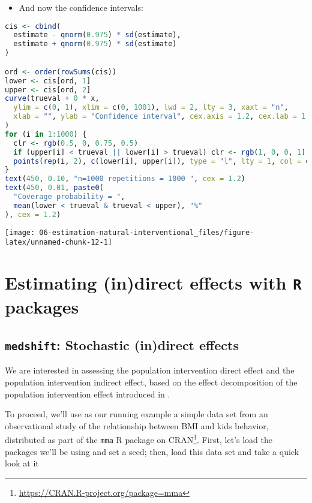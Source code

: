 \documentclass[
  12pt,
]{book}
\newcommand{\passthrough}[1]{#1}
\providecommand{\tightlist}{%
  \setlength{\itemsep}{0pt}\setlength{\parskip}{0pt}}
\renewcommand{\href}[2]{#2\footnote{\url{#1}}}
\theoremstyle{definition}
\theoremstyle{definition}
\theoremstyle{definition}
\newcommand{\1}{\mathbbm{1}}
\begin{document}
\begin{itemize}
\tightlist
\item
  And now the confidence intervals:
\end{itemize}

\begin{lstlisting}[language=R]
cis <- cbind(
  estimate - qnorm(0.975) * sd(estimate),
  estimate + qnorm(0.975) * sd(estimate)
)

ord <- order(rowSums(cis))
lower <- cis[ord, 1]
upper <- cis[ord, 2]
curve(trueval + 0 * x,
  ylim = c(0, 1), xlim = c(0, 1001), lwd = 2, lty = 3, xaxt = "n",
  xlab = "", ylab = "Confidence interval", cex.axis = 1.2, cex.lab = 1.2
)
for (i in 1:1000) {
  clr <- rgb(0.5, 0, 0.75, 0.5)
  if (upper[i] < trueval || lower[i] > trueval) clr <- rgb(1, 0, 0, 1)
  points(rep(i, 2), c(lower[i], upper[i]), type = "l", lty = 1, col = clr)
}
text(450, 0.10, "n=1000 repetitions = 1000 ", cex = 1.2)
text(450, 0.01, paste0(
  "Coverage probability = ",
  mean(lower < trueval & trueval < upper), "%"
), cex = 1.2)
\end{lstlisting}

\begin{center}\texttt{[image: 06-estimation-natural-interventional\_files/figure-latex/unnamed-chunk-12-1]} \end{center}

\hypertarget{estimating-indirect-effects-with-r-packages}{%
\chapter{\texorpdfstring{Estimating (in)direct effects with \texttt{R} packages}{Estimating (in)direct effects with R packages}}\label{estimating-indirect-effects-with-r-packages}}

\hypertarget{medshift-stochastic-indirect-effects}{%
\section{\texorpdfstring{\texttt{medshift}: Stochastic (in)direct effects}{medshift: Stochastic (in)direct effects}}\label{medshift-stochastic-indirect-effects}}

We are interested in assessing the population intervention direct effect and
the population intervention indirect effect, based on the effect decomposition
of the population intervention effect introduced in \citet{diaz2020causal}.

To proceed, we'll use as our running example a simple data set from an
observational study of the relationship between BMI and kids behavior,
distributed as part of the \href{https://CRAN.R-project.org/package=mma}{\passthrough{\lstinline!mma!} R package on
CRAN}. First, let's load the packages
we'll be using and set a seed; then, load this data set and take a quick look
at it
\end{document}
